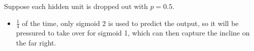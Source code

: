 \begin{example}
    Suppose each hidden unit is dropped out with \( p = 0.5 \).


    \begin{itemize}
        \item \( \frac{1}{4} \) of the time, only sigmoid 2 is used to predict the output, so it will be pressured to take over for sigmoid 1, which can then capture the incline on the far right.
    \end{itemize}
\end{example}